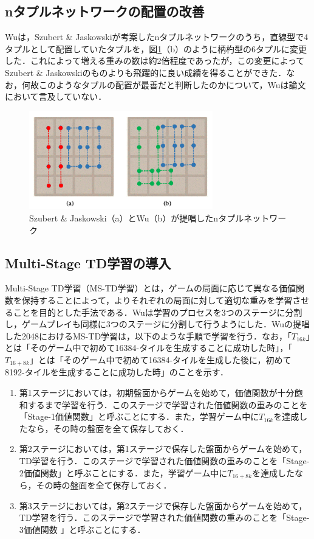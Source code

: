 \documentclass{suribt}
\begin{document}
\subsection{nタプルネットワークの配置の改善}
Wuは，Szubert \& Jaskowskiが考案したnタプルネットワークのうち，直線型で4タプルとして配置していたタプルを，図\ref{figure_002}（b）のように柄杓型の6タプルに変更した．これによって増える重みの数は約2倍程度であったが，この変更によってSzubert \& Jaskowskiのものよりも飛躍的に良い成績を得ることができた．なお，何故このようなタプルの配置が最善だと判断したのかについて，Wuは論文において言及していない．

\begin{figure}[t]
	\begin{center}
	\includegraphics[width=8cm]{figure_002.png}
	\caption{Szubert \& Jaskowski（a）とWu（b）が提唱したnタプルネットワーク}
	\label{figure_002}
	\end{center}
\end{figure}

\subsection{Multi-Stage TD学習の導入}
Multi-Stage TD学習（MS-TD学習）とは，ゲームの局面に応じて異なる価値関数を保持することによって，よりそれぞれの局面に対して適切な重みを学習させることを目的とした手法である．Wuは学習のプロセスを3つのステージに分割し，ゲームプレイも同様に3つのステージに分割して行うようにした．Wuの提唱した2048におけるMS-TD学習は，以下のような手順で学習を行う．なお，「$T_{16k}$」とは「そのゲーム中で初めて16384-タイルを生成することに成功した時」，「$T_{16+8k}$」とは「そのゲーム中で初めて16384-タイルを生成した後に，初めて8192-タイルを生成することに成功した時」のことを示す．

\begin{enumerate}
\item 第1ステージにおいては，初期盤面からゲームを始めて，価値関数が十分飽和するまで学習を行う．このステージで学習された価値関数の重みのことを「Stage-1価値関数」と呼ぶことにする．また，学習ゲーム中に$T_{16k}$を達成したなら，その時の盤面を全て保存しておく．
\item 第2ステージにおいては，第1ステージで保存した盤面からゲームを始めて，TD学習を行う．このステージで学習された価値関数の重みのことを「Stage-2価値関数」と呼ぶことにする．また，学習ゲーム中に$T_{16+8k}$を達成したなら，その時の盤面を全て保存しておく．
\item 第3ステージにおいては，第2ステージで保存した盤面からゲームを始めて，TD学習を行う．このステージで学習された価値関数の重みのことを「Stage-3価値関数
」と呼ぶことにする．
\end{enumerate}
\end{document}
